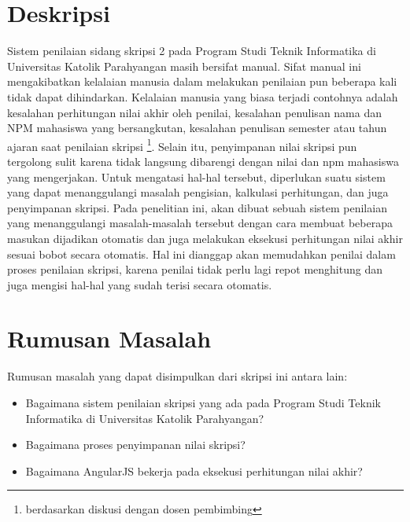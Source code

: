 \documentclass[a4paper,twoside]{article}
\begin{document}
\title{\@judultopik}
\author{\nama \textendash \@npm} 

\newcommand{\nama}{Billy Yanuar}
\newcommand{\@npm}{2012730017}
\newcommand{\@judultopik}{Sistem Penilaian Sidang Skripsi 2 dengan AngularJS} %
\newcommand{\jumpemb}{1} %
\newcommand{\tanggal}{11/02/2016}
\maketitle


\section{Deskripsi}
Sistem penilaian sidang skripsi 2 pada Program Studi Teknik Informatika di Universitas Katolik Parahyangan masih bersifat manual. Sifat manual ini mengakibatkan kelalaian manusia dalam melakukan penilaian pun beberapa kali tidak dapat dihindarkan. Kelalaian manusia yang biasa terjadi contohnya adalah kesalahan perhitungan nilai akhir oleh penilai, kesalahan penulisan nama dan NPM mahasiswa yang bersangkutan, kesalahan penulisan semester atau tahun ajaran saat penilaian skripsi \footnote{berdasarkan diskusi dengan dosen pembimbing}. Selain itu, penyimpanan nilai skripsi pun tergolong sulit karena tidak langsung dibarengi dengan nilai dan npm mahasiswa yang mengerjakan. Untuk mengatasi hal-hal tersebut, diperlukan suatu sistem yang dapat menanggulangi masalah pengisian, kalkulasi perhitungan, dan juga penyimpanan skripsi.
Pada penelitian ini, akan dibuat sebuah sistem penilaian yang menanggulangi masalah-masalah tersebut dengan cara membuat beberapa masukan dijadikan otomatis dan juga melakukan eksekusi perhitungan nilai akhir sesuai bobot secara otomatis. Hal ini dianggap akan memudahkan penilai dalam proses penilaian skripsi, karena penilai tidak perlu lagi repot menghitung dan juga mengisi hal-hal yang sudah terisi secara otomatis.


\section{Rumusan Masalah}
Rumusan masalah yang dapat disimpulkan dari skripsi ini antara lain:
\begin{itemize}
	\item Bagaimana sistem penilaian skripsi yang ada pada Program Studi Teknik Informatika di Universitas Katolik Parahyangan?
	\item Bagaimana proses penyimpanan nilai skripsi?
	\item Bagaimana AngularJS bekerja pada eksekusi perhitungan nilai akhir?
\end{itemize}
\end{document}
